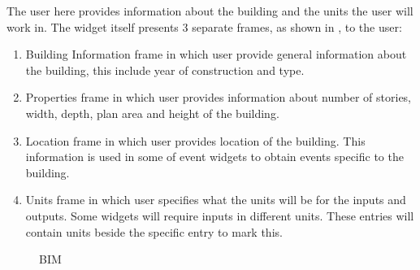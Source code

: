 The user here provides information about the building and the units
the user will work in. The widget itself presents 3 separate frames,
as shown in , to the user:

\begin{enumerate}
\item Building Information frame in which user provide general information about the building, this include year of construction and type.
\item Properties frame in which user provides information about number of stories, width, depth, plan area and height of the building.
\item Location frame in which user provides location of the building. This information is used in some of event widgets to obtain events specific to the building.
\item Units frame  in which user specifies what the units will be for the inputs and outputs. Some widgets will require inputs in different units. These entries will contain units beside the specific entry to mark this.
\end{enumerate}


\begin{figure}[!htbp]
  \caption{BIM}
  \label{fig:figure2}
\end{figure}

